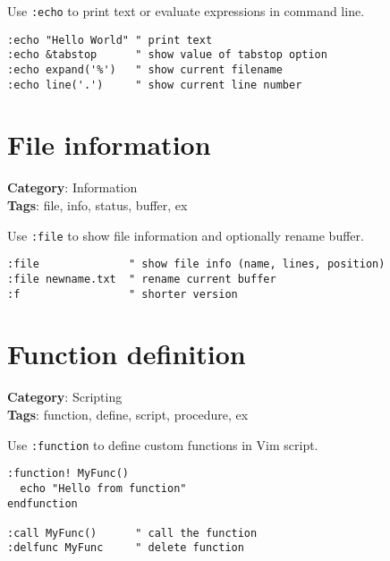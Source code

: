 {{{{{{Use {\footnotesize \Verb§:echo§} to print text or evaluate expressions in command line.

\begin{Exa*}{}
\begin{Verbatim}[fontsize=\footnotesize, breaklines, breakanywhere]
:echo "Hello World" " print text
:echo &tabstop      " show value of tabstop option
:echo expand('%')   " show current filename
:echo line('.')     " show current line number
\end{Verbatim}
\end{Exa*}

\section{File information}

\textbf{Category}: Information\\ \textbf{Tags}: file, info, status, buffer, ex
\vspace{0.5cm}

Use {\footnotesize \Verb§:file§} to show file information and optionally rename buffer.

\begin{Exa*}{}
\begin{Verbatim}[fontsize=\footnotesize, breaklines, breakanywhere]
:file              " show file info (name, lines, position)
:file newname.txt  " rename current buffer
:f                 " shorter version
\end{Verbatim}
\end{Exa*}

\section{Function definition}

\textbf{Category}: Scripting\\ \textbf{Tags}: function, define, script, procedure, ex
\vspace{0.5cm}

Use {\footnotesize \Verb§:function§} to define custom functions in Vim script.

\begin{Exa*}{}
\begin{Verbatim}[fontsize=\footnotesize, breaklines, breakanywhere]
:function! MyFunc()
  echo "Hello from function"
endfunction

:call MyFunc()      " call the function
:delfunc MyFunc     " delete function
\end{Verbatim}
\end{Exa*}

}}}}}}
